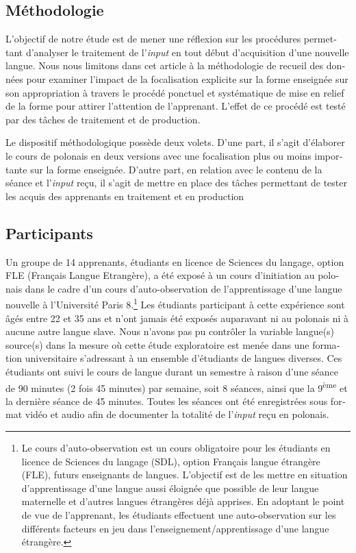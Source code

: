 \documentclass[output=paper]{langscibook}
\begin{document}
\begin{otherlanguage}{french}
\section{Méthodologie}\label{sec:watorek:4}

L’objectif de notre étude est de mener une réflexion sur les procédures permettant d’analyser le traitement de l’\textit{input} en tout début d’acquisition d’une nouvelle langue. Nous nous limitons dans cet article à la méthodologie de recueil des données pour examiner l’impact de la focalisation explicite sur la forme enseignée sur son appropriation à travers le procédé ponctuel et systématique de mise en relief de la forme pour attirer l’attention de l’apprenant. L’effet de ce procédé est testé par des tâches de traitement et de production.

Le dispositif méthodologique possède deux volets. D’une part, il s’agit d’élaborer le cours de polonais en deux versions avec une focalisation plus ou moins importante sur la forme enseignée. D’autre part, en relation avec le contenu de la séance et l’\textit{input} reçu, il s’agit de mettre en place des tâches permettant de tester les acquis des apprenants en traitement et en production


\subsection{Participants}\label{sec:watorek:4.1}

Un groupe de 14 apprenants, étudiants en licence de Sciences du langage, option FLE (Français Langue Etrangère), a été exposé à un cours d’initiation au polonais dans le cadre d’un cours d’auto-observation de l’apprentissage d’une langue nouvelle à l’Université Paris 8.\footnote{ {Le cours d’auto-observation est un cours obligatoire pour les étudiants en licence de Sciences du langage (SDL), option Français langue étrangère (FLE), futurs enseignants de langues. L’objectif est de les mettre en situation d’apprentissage d’une langue aussi éloignée que possible de leur langue maternelle et d’autres langues étrangères déjà apprises. En adoptant le point de vue de l’apprenant, les étudiants effectuent une auto-observation sur les différents facteurs en jeu dans l’enseignement/apprentissage d’une langue étrangère.}} Les étudiants participant à cette expérience sont âgés entre 22 et 35 ans et n’ont jamais été exposés auparavant ni au polonais ni à aucune autre langue slave. Nous n’avons  pas pu contrôler la variable langue(s) source(s) dans la mesure où cette étude exploratoire est menée dans une formation universitaire s’adressant à un ensemble d’étudiants de langues diverses. Ces étudiants ont suivi le cours de langue durant un semestre à raison d’une séance de 90 minutes (2 fois 45 minutes) par semaine, soit 8 séances, ainsi que la 9\textsuperscript{ème} et la dernière séance de 45 minutes. Toutes les séances ont été enregistrées sous format vidéo et audio afin de documenter la totalité de l’\textit{input} reçu en polonais.


\end{otherlanguage}
\end{document}
